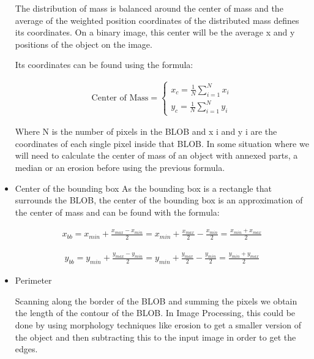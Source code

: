 \begin{itemize}
The distribution of mass is balanced around the center of mass and the average of the weighted position coordinates of the distributed mass defines its coordinates. On a binary image, this center will be the average x and y positions of the object on the image.

Its coordinates can be found using the formula:

\begin{equation}
	\begin{aligned}
  		\ \text{Center of Mass} = \left\{ \begin{array}{ll}
         x_{c}=\displaystyle\frac{1}{N} \displaystyle\sum_{i=1}^N x_{i}\\
         y_{c}=\displaystyle\frac{1}{N} \displaystyle\sum_{i=1}^N y_{i}
        \end{array} \right . \ 
 	\end{aligned}
\end{equation} 


Where N is the number of pixels in the BLOB and x i and y i are the coordinates of each single pixel inside that BLOB. In some situation where we will need to calculate the center of mass of an object with annexed parts, a median or an erosion before using the previous formula.
\item Center of the bounding box
As the bounding box is a rectangle that surrounds the BLOB, the center of the bounding box is an approximation of the center of mass and can be found with the formula:

\begin{equation}
	\begin{aligned}	x_{bb}=x_{min}+\displaystyle\frac{x_{max}-x_{min}}{2}=x_{min}+\displaystyle\frac{x_{max}}{2}-\displaystyle\frac{x_{min}}{2}=\displaystyle\frac{x_{min}+x_{max}}{2}
	\label{BoundingBoxCenterX}
	\end{aligned}
\end{equation}

\begin{equation}	
	\begin{aligned}
	y_{bb}=y_{min}+\displaystyle\frac{y_{max}-y_{min}}{2}=y_{min}+\displaystyle\frac{y_{max}}{2}-\displaystyle\frac{y_{min}}{2}=\displaystyle\frac{y_{min}+y_{max}}{2}
	\label{BoundingBoxCenterY}
	\end{aligned}
\end{equation}


\item Perimeter

Scanning along the border of the BLOB and summing the pixels we obtain the length of the contour of the BLOB. In Image Processing, this could be done by using morphology techniques like erosion to get a smaller version of the object and then subtracting this to the input image in order to get the edges.


\end{itemize}
